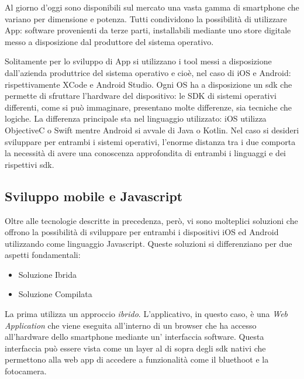 Al giorno d'oggi sono disponibili sul mercato una vasta gamma di smartphone che variano per dimensione e potenza. Tutti condividono la possibilità di utilizzare App: software provenienti da terze parti, installabili mediante uno store digitale messo a disposizione dal produttore del sistema operativo.\vspace{5mm}

Solitamente per lo sviluppo di App si utilizzano i tool messi a disposizione dall'azienda produttrice del sistema operativo e cioè, nel caso di iOS e Android: rispettivamente XCode e Android Studio. Ogni OS ha a disposizione un sdk che permette di sfruttare l'hardware del dispositivo: le SDK di sistemi operativi differenti, come si può immaginare, presentano molte differenze, sia tecniche che logiche. La differenza principale sta nel linguaggio utilizzato: iOS utilizza ObjectiveC o Swift mentre Android si avvale di Java o Kotlin. Nel caso si desideri sviluppare per entrambi i sistemi operativi, l'enorme distanza tra i due comporta la necessità di avere una conoscenza approfondita di entrambi i linguaggi e dei rispettivi sdk.\vspace{5mm}

\subsection{Sviluppo mobile e Javascript}\vspace{5mm}

Oltre alle tecnologie descritte in precedenza, però, vi sono molteplici soluzioni che offrono la possibilità di sviluppare per entrambi i dispositivi iOS ed Android utilizzando come linguaggio Javascript. Queste soluzioni si differenziano per due aspetti fondamentali:
\begin{itemize}
\item Soluzione Ibrida
\item Soluzione Compilata
\end{itemize}

La prima utilizza un approccio \emph{ibrido}. L'applicativo, in questo caso, è una \emph{Web Application} che viene eseguita all'interno di un browser che ha accesso all'hardware dello smartphone mediante un' interfaccia software. Questa interfaccia può essere vista come un layer al di sopra degli sdk nativi che permettono alla web app di accedere a funzionalità come il bluethoot e la fotocamera.\vspace{5mm}

